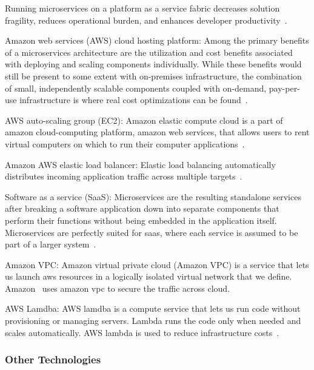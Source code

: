 Running microservices on a platform as a service fabric decreases solution fragility, reduces operational burden, and enhances developer productivity~\cite{rosa2018, Mikail2020}.

\par Amazon web services (AWS) cloud hosting platform: Among the primary benefits of a microservices architecture are the utilization and cost benefits associated with deploying and scaling components individually. While these benefits would still be present to some extent with on-premises infrastructure, the combination of small, independently scalable components coupled with on-demand, pay-per-use infrastructure is where real cost optimizations can be found~\cite{McElhiney2018}.

\par AWS auto-scaling group (EC2): Amazon elastic compute cloud is a part of amazon cloud-computing platform, amazon web services, that allows users to rent virtual computers on which to run their computer applications~\cite{McElhiney2018}.

\par Amazon AWS elastic load balancer: Elastic load balancing automatically distributes incoming application traffic across multiple targets~\cite{McElhiney2018}.

\par Software as a service (SaaS): Microservices are the resulting standalone services after breaking a software application down into separate components that perform their functions without being embedded in the application itself. Microservices are perfectly suited for saas, where each service is assumed to be part of a larger system~\cite{haugeland2020}.

\par Amazon VPC: Amazon virtual private cloud (Amazon VPC) is a service that lets us launch aws resources in a logically isolated virtual network that we define. Amazon~\cite{Amazon} uses amazon vpc to secure the traffic across cloud.

\par AWS Lamdba: AWS lamdba is a compute service that lets us run code without provisioning or managing servers. Lambda runs the code only when needed and scales automatically. AWS lambda is used to reduce infrastructure costs~\cite{villamizar2017}.

\subsubsection{Other Technologies}

